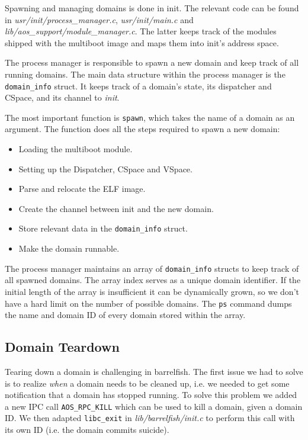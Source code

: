 \documentclass[a4paper,10pt]{article}
\newcommand{\filepath}[1]{\emph{ #1}}
\begin{document}
Spawning and managing domains is done in init.
The relevant code can be found in \filepath{usr/init/process\_manager.c}, \filepath{usr/init/main.c} and \filepath{lib/aos\_support/module\_manager.c}.
The latter keeps track of the modules shipped with the multiboot image and maps them into init's address space.

The process manager is responsible to spawn a new domain and keep track of all running domains.
The main data structure within the process manager is the \lstinline!domain_info! struct.
It keeps track of a domain's state, its dispatcher and CSpace, and its channel to \emph{init}.

The most important function is \lstinline!spawn!, which takes the name of a domain as an argument.
The function does all the steps required to spawn a new domain:
\begin{itemize}
 \item Loading the multiboot module.
 \item Setting up the Dispatcher, CSpace and VSpace.
 \item Parse and relocate the ELF image.
 \item Create the channel between init and the new domain.
 \item Store relevant data in the \lstinline!domain_info! struct.
 \item Make the domain runnable.
\end{itemize}

The process manager maintains an array of \lstinline!domain_info! structs to keep track of all spawned domains.
The array index serves as a unique domain identifier.
If the initial length of the array is insufficient it can be dynamically grown, so we don't have a hard limit on the number of possible domains.
The \lstinline!ps! command dumps the name and domain ID of every domain stored within the array.

\subsection {Domain Teardown}

Tearing down a domain is challenging in barrelfish.
The first issue we had to solve is to realize \emph{when} a domain needs to be cleaned up, i.e. we needed to get some notification that a domain has stopped running.
To solve this problem we added a new IPC call \lstinline!AOS_RPC_KILL! which can be used to kill a domain, given a domain ID.
We then adapted \lstinline!libc_exit! in \filepath{lib/barrelfish/init.c} to perform this call with its own ID (i.e. the domain commits suicide).
\end{document}
